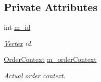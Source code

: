 \subsection*{Private Attributes}
\begin{CompactItemize}
\item 
\hypertarget{classVertex_3585b1e28a229a6aefb68913e5333d8b}{
int \hyperlink{classVertex_3585b1e28a229a6aefb68913e5333d8b}{m\_\-id}}
\label{classVertex_3585b1e28a229a6aefb68913e5333d8b}

\begin{CompactList}\small\item\em \hyperlink{classVertex}{Vertex} id. \item\end{CompactList}\item 
\hypertarget{classVertex_de8320ac627d61a76204549cd0b12554}{
\hyperlink{classVertex_40a06cc3fde98913c8259e3c11cd37ec}{Order\-Context} \hyperlink{classVertex_de8320ac627d61a76204549cd0b12554}{m\_\-order\-Context}}
\label{classVertex_de8320ac627d61a76204549cd0b12554}

\begin{CompactList}\small\item\em Actual order context. \item\end{CompactList}\end{CompactItemize}
